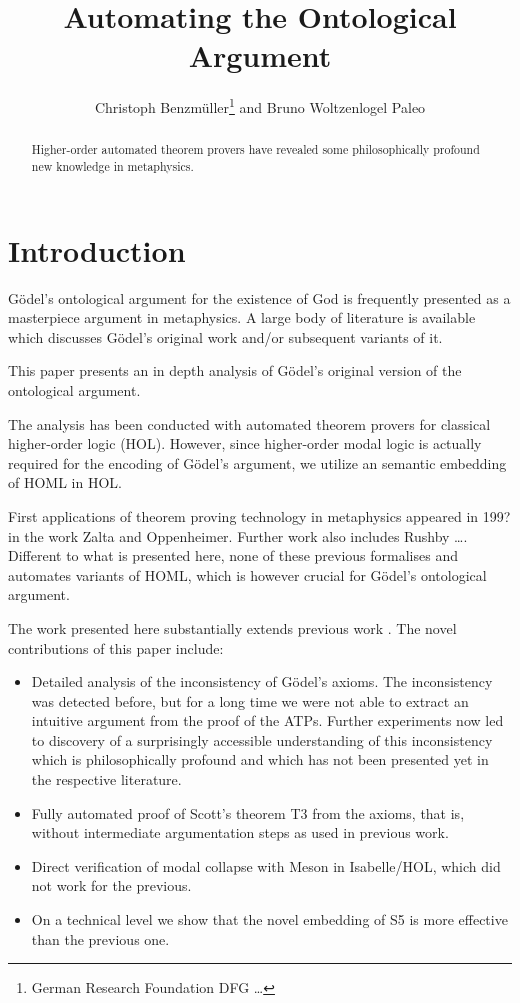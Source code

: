 \documentclass{article}
\title{Automating the Ontological Argument}
\author{Christoph Benzmüller\thanks{German Research Foundation DFG \ldots} and Bruno Woltzenlogel Paleo}
\author{}
\begin{document}
\maketitle

\begin{abstract}
  Higher-order automated theorem provers have revealed some
  philosophically profound new knowledge in metaphysics.
\end{abstract}

\section{Introduction}
G\"{o}del's ontological argument for the existence of God is frequently
presented as a masterpiece argument in metaphysics. A large body of
literature is available which discusses G\"{o}del's original work and/or
subsequent variants of it.

This paper presents an in depth analysis of G\"{o}del's original version
of the ontological argument.   

The analysis has been conducted with automated theorem provers for
classical higher-order logic (HOL). However, since higher-order modal
logic is actually required for the encoding of G\"{o}del's argument, we
utilize an semantic embedding of HOML in HOL.


First applications of theorem proving technology in metaphysics
appeared in 199? in the work Zalta and Oppenheimer.  Further work also
includes Rushby \ldots. Different to what is presented here, none of
these previous formalises and automates variants of HOML, which is
however crucial for G\"{o}del's ontological argument.


The work presented here substantially extends previous work \cite{}.  
The novel contributions of this paper include:

\begin{itemize}
\item Detailed analysis of the inconsistency of G\"{o}del's axioms. The
inconsistency was detected before, but for a long time we were not
able to extract an intuitive argument from the proof of the ATPs.
Further experiments now led to discovery of a surprisingly accessible
understanding of this inconsistency which is philosophically profound
and which has not been presented yet in the respective literature.

\item Fully automated proof of Scott's theorem T3 from the axioms, that
   is, without intermediate argumentation steps as used in previous
   work.

\item Direct verification of modal collapse with Meson in Isabelle/HOL,
which did not work for the previous.

\item On a technical level we show that the novel embedding of S5 is more
    effective than the previous one.
\end{itemize}
\end{document}
